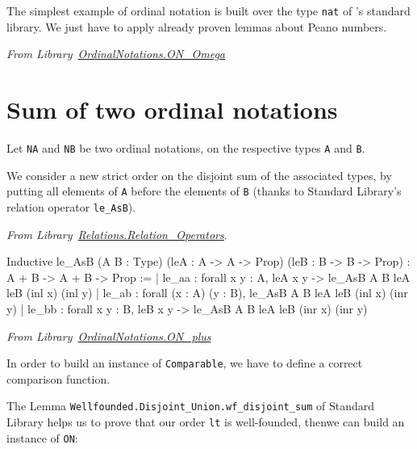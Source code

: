 The simplest example of ordinal notation is built over the type \texttt{nat} of \coq's standard library. We just have to apply already proven lemmas about Peano numbers.

\vspace{4pt}
\noindent\emph{From Library~\href{../theories/html/hydras.OrdinalNotations.ON_Omega.html}{OrdinalNotations.ON\_Omega}}



\section{Sum of  two ordinal notations}

Let \texttt{NA} and \texttt{NB} be two ordinal notations, on the respective types \texttt{A} and \texttt{B}.

 We consider a new strict order
on the disjoint sum of the associated types, by putting all elements of \texttt{A} before the elements of \texttt{B} (thanks to Standard Library's relation operator \texttt{le\_AsB}).

\vspace{4pt}
\noindent
\emph{From Library~\href{https://coq.inria.fr/distrib/current/stdlib/Coq.Relations.Relation_Operators.html}{Relations.Relation\_Operators}}.

\begin{Coqanswer}
Inductive
le_AsB (A B : Type) (leA : A -> A -> Prop) (leB : B -> B -> Prop)
  : A + B -> A + B -> Prop :=
| le_aa : forall x y : A, leA x y -> le_AsB A B leA leB (inl x) (inl y)
| le_ab : forall (x : A) (y : B), le_AsB A B leA leB (inl x) (inr y)
| le_bb : forall x y : B, leB x y -> le_AsB A B leA leB (inr x) (inr y)
\end{Coqanswer}

\pagebreak

\vspace{4pt}
\noindent\emph{From Library~\href{../theories/html/hydras.OrdinalNotations.ON_plus.html}{OrdinalNotations.ON\_plus}}




In order to build an instance of \texttt{Comparable}, we have to define a correct comparison function.



The Lemma \texttt{Wellfounded.Disjoint\_Union.wf\_disjoint\_sum} of Standard Library
helps us to prove that our order \texttt{lt} is well-founded, thenwe can build an instance of \texttt{ON}:

